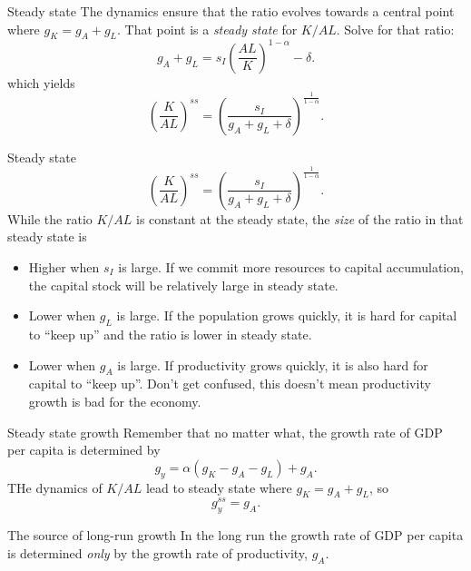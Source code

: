 \begin{frame}{Steady state}
The dynamics ensure that the ratio evolves towards a central point where $g_K = g_A + g_L$. That point is a \textit{steady state} for $K/AL$. Solve for that ratio:
\begin{equation}
	g_A + g_L = s_I \left(\frac{AL}{K}\right)^{1-\alpha} - \delta. \nonumber
\end{equation}
which yields
\begin{equation}
	\left(\frac{K}{AL}\right)^{ss} = \left(\frac{s_I}{g_A + g_L + \delta}\right)^{\frac{1}{1-\alpha}}. \label{EQ_KAL_ss}
\end{equation}
\end{frame}

\begin{frame}{Steady state}
\begin{equation}
	\left(\frac{K}{AL}\right)^{ss} = \left(\frac{s_I}{g_A + g_L + \delta}\right)^{\frac{1}{1-\alpha}}. \label{EQ_KAL_ss}
\end{equation}
While the ratio $K/AL$ is constant at the steady state, the \textit{size} of the ratio in that steady state is
\begin{itemize}
	\item Higher when $s_I$ is large. If we commit more resources to capital accumulation, the capital stock will be relatively large in steady state.
	\item Lower when $g_L$ is large. If the population grows quickly, it is hard for capital to ``keep up'' and the ratio is lower in steady state.
	\item Lower when $g_A$ is large. If productivity grows quickly, it is also hard for capital to ``keep up''. Don't get confused, this doesn't mean productivity growth is bad for the economy.
\end{itemize}
\end{frame}

\begin{frame}{Steady state growth}
Remember that no matter what, the growth rate of GDP per capita is determined by 
\begin{equation}
	g_y = \alpha(g_K - g_A - g_L) + g_A. \nonumber
\end{equation}
THe dynamics of $K/AL$ lead to steady state where $g_K = g_A + g_L$, so
\begin{equation}
	g_y^{ss} = g_A.
\end{equation}

\begin{block}{The source of long-run growth}
In the long run the growth rate of GDP per capita is determined \textit{only} by the growth rate of productivity, $g_A$.
\end{block}
\end{frame}

